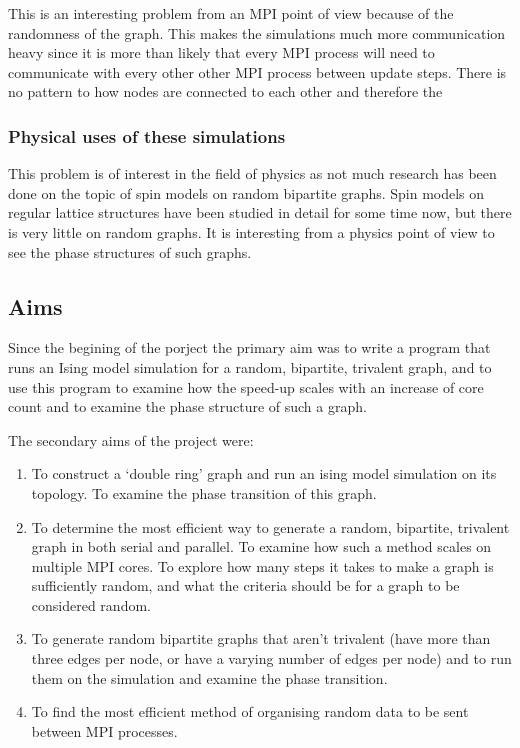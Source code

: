 \documentclass[pdftex,12pt,a4paper]{article}
\begin{document}
This is an interesting problem from an MPI point of view because of the randomness of the graph. This makes the simulations much more communication heavy since it is more than likely that every MPI process will need to communicate with every other other MPI process between update steps. There is no pattern to how nodes are connected to each other and therefore the 


\subsubsection{Physical uses of these simulations}

This problem is of interest in the field of physics as not much research has been done on the topic of spin models on random bipartite graphs. Spin models on regular lattice structures have been studied in detail for some time now, but there is very little on random graphs. It is interesting from a physics point of view to see the phase structures of such graphs.

\subsection{Aims}

Since the begining of the porject the primary aim was to write a program that runs an Ising model simulation for a random, bipartite, trivalent graph, and to use this program to examine how the speed-up scales with an increase of core count and to examine the phase structure of such a graph.

The secondary aims of the project were:
\begin{enumerate}
\item To construct a `double ring' graph and run an ising model simulation on its topology. To examine the phase transition of this graph.
\item To determine the most efficient way to generate a random, bipartite, trivalent graph in both serial and parallel. To examine how such a method scales on multiple MPI cores. To explore how many steps it takes to make a graph is sufficiently random, and what the criteria should be for a graph to be considered random.
\item To generate random bipartite graphs that aren't trivalent (have more than three edges per node, or have a varying number of edges per node) and to run them on the simulation and examine the phase transition.
\item To find the most efficient method of organising random data to be sent between MPI processes.
\end{enumerate}
\end{document}
